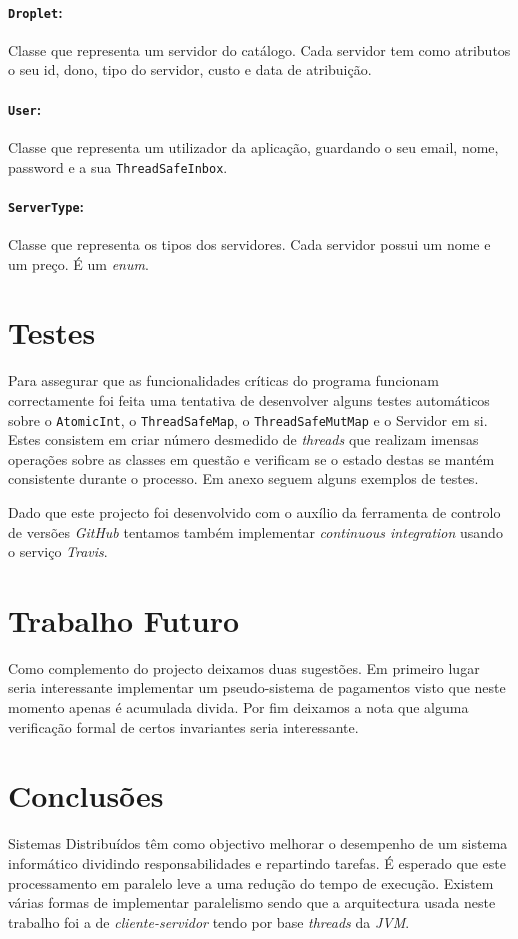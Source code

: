 \documentclass[a4paper]{article}
\begin{document}
\paragraph{\texttt{Droplet}:}
Classe que representa um servidor do catálogo. Cada servidor tem como atributos o seu id, dono, tipo do servidor, custo e data de atribuição.

\paragraph{\texttt{User}:}
Classe que representa um utilizador da aplicação, guardando o seu email, nome, password e a sua \texttt{ThreadSafeInbox}.

\paragraph{\texttt{ServerType}:}
Classe que representa os tipos dos servidores. Cada servidor possui um nome e um preço. É um \textit{enum}.

\section{Testes}
Para assegurar que as funcionalidades críticas do programa funcionam correctamente foi feita uma tentativa de desenvolver alguns testes automáticos sobre o \texttt{AtomicInt}, o \texttt{ThreadSafeMap}, o \texttt{ThreadSafeMutMap} e o Servidor em si. Estes consistem em criar número desmedido de \textit{threads} que realizam imensas operações sobre as classes em questão e verificam se o estado destas se mantém consistente durante o processo. Em anexo seguem alguns exemplos de testes.

Dado que este projecto foi desenvolvido com o auxílio da ferramenta de controlo de versões \textit{GitHub} tentamos também implementar \textit{continuous integration} usando o serviço \textit{Travis}.

\section{Trabalho Futuro}

Como complemento do projecto deixamos duas sugestões.
Em primeiro lugar seria interessante implementar um pseudo-sistema de pagamentos visto que neste momento apenas é acumulada divida.
Por fim deixamos a nota que alguma verificação formal de certos invariantes seria interessante.

\section{Conclusões}
Sistemas Distribuídos têm como objectivo melhorar o desempenho de um sistema informático dividindo responsabilidades e repartindo tarefas. É esperado que este processamento em paralelo leve a uma redução do tempo de execução.
Existem várias formas de implementar paralelismo sendo que a arquitectura usada neste trabalho foi a de \textit{cliente-servidor} tendo por base \textit{threads} da \textit{JVM}.
\end{document}
